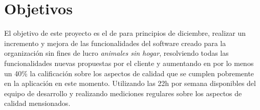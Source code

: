 \section{Objetivos}

El objetivo de este proyecto es el de para principios de diciembre, realizar un incremento y mejora de las funcionalidades del software creado para la organización sin fines de lucro \textit{animales sin hogar}, resolviendo todas las funcionalidades nuevas propuestas por el cliente y aumentando en por lo menos un 40\% la calificación sobre los aspectos de calidad que se cumplen pobremente en la aplicación en este momento. Utilizando las 22h por semana disponibles del equipo de desarrollo y realizando mediciones regulares sobre los aspectos de calidad mensionados.

\begin{comment}

S:
    quien: equipo de desarrollo
    que: aumento de las funcionalidades de la aplicación
    donde: n/a

M:
    - resolución de todas las mejoras propuestas por el cliente
    - mejora en un 40\% de la calificación sobre los aspectos de calidad que se incumplen en la aplicación

A:
    - Utilizando el tiempo 22h por semana disponible del equipo de desarrollo
    - Realizando mediciones regulares de los aspectos de calidad
    
R:
    - 
    
T:
    - Para principios de diciembre

The S.M.A.R.T. acronym stands for:


    S=Smart
    M=Measurable
    A=Achievable
    R=Realistic
    T=Time-bound

And here’s what each part means:


Specific

Make sure your objective is clearly defined. Narrow your scope of the objective so that is has a very tangible and specific outcome. This helps you focus your intent. When writing this part of the objective think of the Who, What, Where, When and Why of it all.


Measurable

Make sure you can actually quantify the objective. If it’s not measurable, you won’t know when the project objective has been met. You want to make sure the objective is trackable to keep you and the team accountable.


Achievable


\end{comment}
